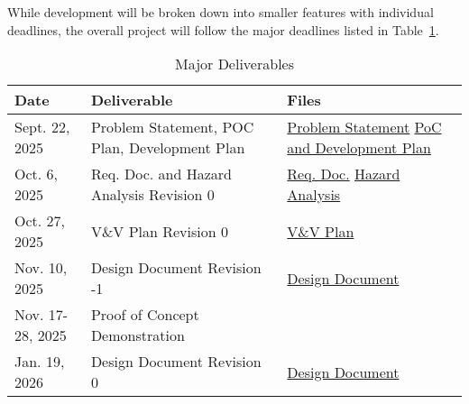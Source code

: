 \documentclass{article}
\begin{document}
While development will be broken down into smaller features with individual
deadlines, the overall project will follow the major deadlines listed in
Table~\ref{TblMajorDeliverables}.

\FloatBarrier
\begin{table}[h]
  \caption{Major Deliverables} \label{TblMajorDeliverables}
  \begin{tabularx}{\textwidth}{llX}
    \toprule
    \textbf{Date}    & \textbf{Deliverable}                          & \textbf{Files}                                                                                                                                   \\
    \midrule
    Sept. 22, 2025   & Problem Statement, POC Plan, Development Plan & \href{https://github.com/ZifanSi/vision-guided-tracker/blob/main/docs/ProblemStatementAndGoals/ProblemStatement.pdf}{Problem Statement} \newline
    \href{https://github.com/ZifanSi/vision-guided-tracker/blob/main/docs/DevelopmentPlan/DevelopmentPlan.pdf}{PoC and Development Plan}                                                                                \\
    Oct. 6, 2025     & Req. Doc. and Hazard Analysis Revision 0      & \href{https://github.com/ZifanSi/vision-guided-tracker/blob/main/docs/SRS/SRS.pdf}{Req. Doc.}    \newline
    \href{https://github.com/ZifanSi/vision-guided-tracker/blob/main/docs/HazardAnalysis/HazardAnalysis.pdf}{Hazard Analysis}                                                                                           \\
    Oct. 27, 2025    & V\&V Plan Revision 0                          & \href{https://github.com/ZifanSi/vision-guided-tracker/blob/main/docs/VnVPlan/VnVPlan.pdf}{V\&V Plan}                                            \\
    Nov. 10, 2025    & Design Document Revision -1                   & \href{https://github.com/ZifanSi/vision-guided-tracker/blob/main/docs/Design/README.md}{Design Document}                                         \\
    Nov. 17-28, 2025 & Proof of Concept Demonstration                &                                                                                                                                                  \\
    Jan. 19, 2026    & Design Document Revision 0                    & \href{https://github.com/ZifanSi/vision-guided-tracker/blob/main/docs/Design/README.md}{Design Document}                                         \\

\end{tabularx}
\end{table}
\end{document}
